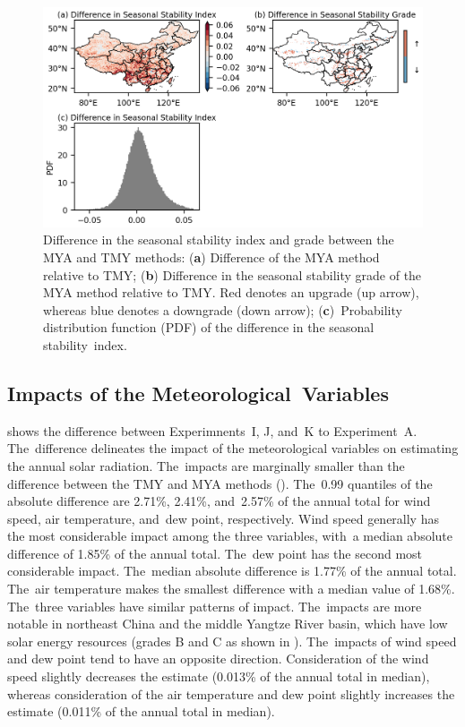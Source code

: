 \documentclass[atmosphere,article,accept,pdftex,moreauthors]{Definitions/mdpi}
\begin{document}
\begin{figure}[H]
  \includegraphics[width=13.8cm]{fig/mya-seasonal-stability-index-grade.png}
  \caption{Difference in the seasonal stability index and grade between the MYA and TMY methods: (\textbf{a}) Difference of the MYA method relative to TMY; (\textbf{b}) Difference in the seasonal stability grade of the MYA method relative to TMY. Red denotes an upgrade (up arrow), whereas blue denotes a downgrade (down arrow); \mbox{(\textbf{c}) Probability} distribution function (PDF) of the difference in the seasonal stability~index.\label{fig:stability_tmy_mya_diff}}
\end{figure}
\unskip

\subsection{Impacts of the Meteorological~Variables}

 shows the difference between Experimnents~I, J, and~K to Experiment~A. The~difference delineates the impact of the meteorological variables on estimating the annual solar radiation. The~impacts are marginally smaller than the difference between the TMY and MYA methods (). The~0.99 quantiles of the absolute difference are 2.71\%, 2.41\%, and~2.57\% of the annual total for wind speed, air temperature, and~dew point, respectively. Wind speed generally has the most considerable impact among the three variables, with~a median absolute difference of 1.85\% of the annual total. The~dew point has the second most considerable impact. The~median absolute difference is 1.77\% of the annual total. The~air temperature makes the smallest difference with a median value of 1.68\%. The~three variables have similar patterns of impact. The~impacts are more notable in northeast China and the middle Yangtze River basin, which have low solar energy resources (grades B and C as shown in ). The~impacts of wind speed and dew point tend to have an opposite direction. Consideration of the wind speed slightly decreases the estimate (0.013\% of the annual total in median), whereas consideration of the air temperature and dew point slightly increases the estimate (0.011\% of the annual total in median).
\end{document}

